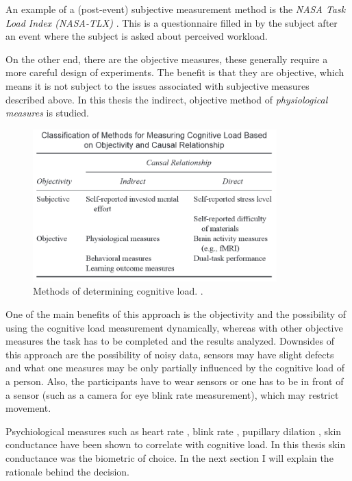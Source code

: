 \documentclass[11pt,leqno,a4paper]{report} %
\begin{document}
\pagebreak

An example of a (post-event) subjective measurement method is the \emph{NASA Task Load Index (NASA-TLX)} \citep{hart1988development}. This is a questionnaire filled in by the subject after an event where the subject is asked about perceived workload.

On the other end, there are the objective measures, these generally require a more careful design of experiments. The benefit is that they are objective, which means it is not subject to the issues associated with subjective measures described above. In this thesis the indirect, objective method of \emph{physiological measures} is studied. 

\begin{figure}[H]
  \centering   
    \includegraphics[width=0.84\textwidth]{meas.png}
  \caption{Methods of determining cognitive load. \citep{brunken2003direct}.}
\end{figure}


One of the main benefits of this approach is the objectivity and the possibility of using the cognitive load measurement dynamically, whereas with other objective measures the task has to be completed and the results analyzed.
Downsides of this approach are the possibility of noisy data, sensors may have slight defects and what one measures may be only partially influenced by the cognitive load of a person. Also, the participants have to wear sensors or one has to be in front of a sensor (such as a camera for eye blink rate measurement), which may restrict movement. 

Psychiological measures such as heart rate \citep{hrn}, blink rate \citep{gowrisankaran2012asthenopia}, pupillary dilation \citep{klingner2008measuring}, skin conductance \citep{Nourbakhsh2012} have been shown to correlate with cognitive load. In this thesis skin conductance was the biometric of choice. In the next section I will explain the rationale behind the decision.
\end{document}
